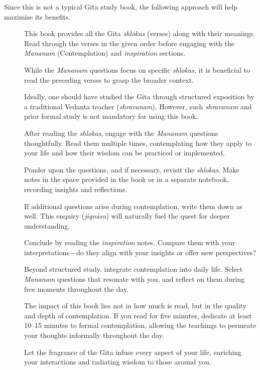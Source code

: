 {\mfontCalibri
Since this is not a typical Gita study book, the following approach will help maximise its benefits.
\begin{description}
  \item[ \textemdash] This book provides all the Gita \emph{shlokas} (verses) along with their meanings. Read through the verses in the given order before engaging with the \emph{Mananam} (Contemplation) and \emph{inspiration} sections.
  \item[ \textemdash] While the \emph{Mananam} questions focus on specific \emph{shlokas}, it is beneficial to read the preceding verses to grasp the broader context.
  \item[ \textemdash] Ideally, one should have studied the Gita through structured exposition by a traditional Vedanta teacher (\emph{shravanam}). However, such \emph{shravanam} and prior formal study is not mandatory for using this book.
  \item[ \textemdash] After reading the \emph{shlokas}, engage with the \emph{Mananam} questions thoughtfully. Read them multiple times, contemplating how they apply to your life and how their wisdom can be practiced or implemented.
  \item[  \textemdash] Ponder upon the questions, and if necessary, revisit the \emph{shlokas}. Make notes in the space provided in the book or in a separate notebook, recording insights and reflections.
  \item[  \textemdash] If additional questions arise during contemplation, write them down as well. This enquiry (\emph{jignāsu}) will naturally fuel the quest for deeper understanding.
  \item[  \textemdash] Conclude by reading the \emph{inspiration} notes. Compare them with your interpretations—do they align with your insights or offer new perspectives?
  \item[  \textemdash] Beyond structured study, integrate contemplation into daily life. Select \emph{Mananam} questions that resonate with you, and reflect on them during free moments throughout the day.
  \item[ \textemdash] The impact of this book lies not in how much is read, but in the quality and depth of contemplation. If you read for five minutes, dedicate at least 10–15 minutes to formal contemplation, allowing the teachings to permeate your thoughts informally throughout the day.
  \item[ \textemdash] Let the fragrance of the Gita infuse every aspect of your life, enriching your interactions and radiating wisdom to those around you.
\end{description} }
